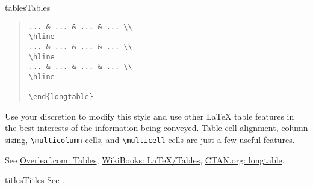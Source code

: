 \begin{sgentry}{tables}{Tables}
\begin{quote}
\begin{verbatim}
... & ... & ... & ... \\
\hline
... & ... & ... & ... \\
\hline
... & ... & ... & ... \\
\hline

\end{longtable}
\end{verbatim}
\end{quote}

    Use your discretion to modify this style and use other LaTeX table features in the best interests of the information being conveyed. Table cell alignment, column sizing, \texttt{{\textbackslash}multicolumn} cells, and \texttt{{\textbackslash}multicell} cells are just a few useful features.

    See \href{https://www.overleaf.com/learn/latex/Tables}{Overleaf.com: Tables}, \href{https://en.wikibooks.org/wiki/LaTeX/Tables}{WikiBooks: LaTeX/Tables}, \href{https://ctan.org/pkg/longtable?lang=en}{CTAN.org: longtable}.
\end{sgentry}

\begin{sgentry}{titles}{Titles}
    See .
\end{sgentry}

